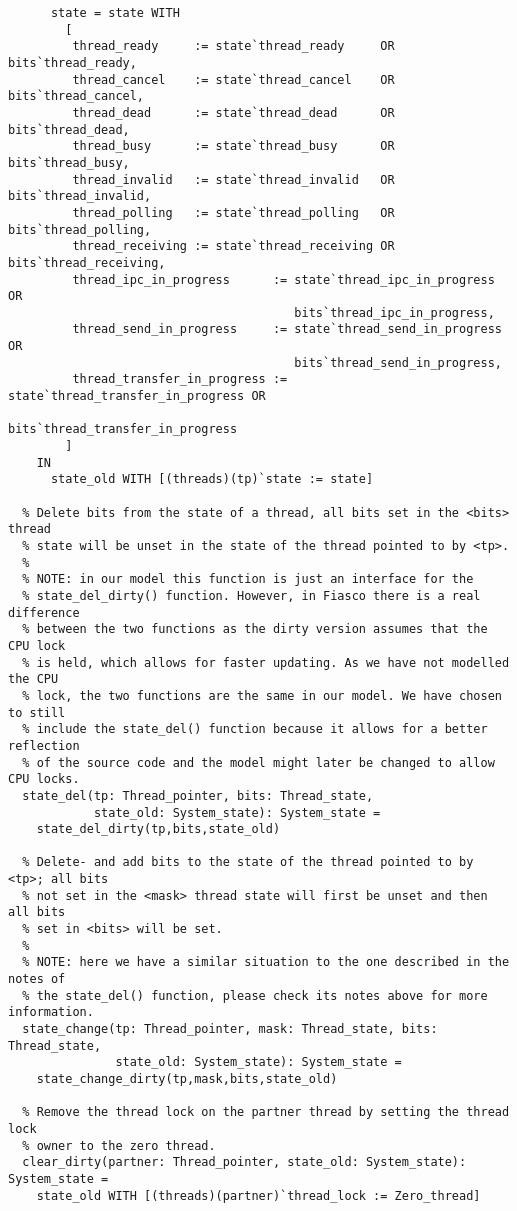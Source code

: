 \begin{lstlisting}
      state = state WITH 
        [
         thread_ready     := state`thread_ready     OR bits`thread_ready,
         thread_cancel    := state`thread_cancel    OR bits`thread_cancel,
         thread_dead      := state`thread_dead      OR bits`thread_dead,
         thread_busy      := state`thread_busy      OR bits`thread_busy,
         thread_invalid   := state`thread_invalid   OR bits`thread_invalid,
         thread_polling   := state`thread_polling   OR bits`thread_polling,
         thread_receiving := state`thread_receiving OR bits`thread_receiving,
         thread_ipc_in_progress      := state`thread_ipc_in_progress OR
                                        bits`thread_ipc_in_progress,
         thread_send_in_progress     := state`thread_send_in_progress OR
                                        bits`thread_send_in_progress,
         thread_transfer_in_progress := state`thread_transfer_in_progress OR
                                        bits`thread_transfer_in_progress
        ]
    IN
      state_old WITH [(threads)(tp)`state := state]

  % Delete bits from the state of a thread, all bits set in the <bits> thread 
  % state will be unset in the state of the thread pointed to by <tp>.
  %
  % NOTE: in our model this function is just an interface for the 
  % state_del_dirty() function. However, in Fiasco there is a real difference
  % between the two functions as the dirty version assumes that the CPU lock
  % is held, which allows for faster updating. As we have not modelled the CPU
  % lock, the two functions are the same in our model. We have chosen to still
  % include the state_del() function because it allows for a better reflection
  % of the source code and the model might later be changed to allow CPU locks.
  state_del(tp: Thread_pointer, bits: Thread_state, 
            state_old: System_state): System_state =
    state_del_dirty(tp,bits,state_old)

  % Delete- and add bits to the state of the thread pointed to by <tp>; all bits
  % not set in the <mask> thread state will first be unset and then all bits
  % set in <bits> will be set.
  %
  % NOTE: here we have a similar situation to the one described in the notes of
  % the state_del() function, please check its notes above for more information.
  state_change(tp: Thread_pointer, mask: Thread_state, bits: Thread_state, 
               state_old: System_state): System_state = 
    state_change_dirty(tp,mask,bits,state_old)
  
  % Remove the thread lock on the partner thread by setting the thread lock
  % owner to the zero thread.
  clear_dirty(partner: Thread_pointer, state_old: System_state): System_state =
    state_old WITH [(threads)(partner)`thread_lock := Zero_thread]


\end{lstlisting}
